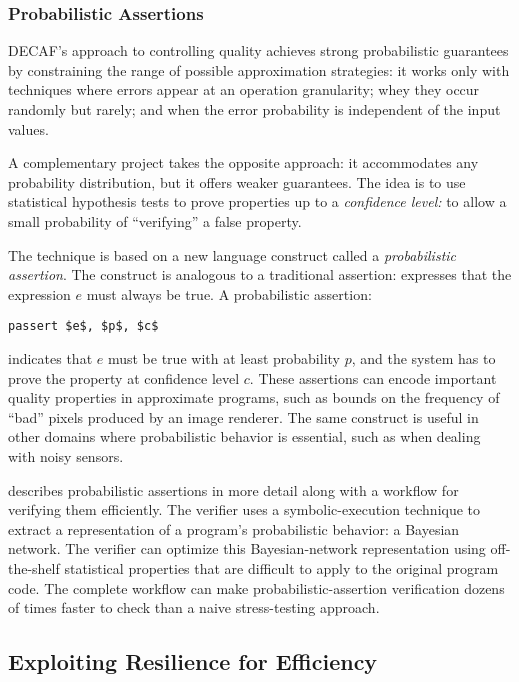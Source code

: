 \subsubsection{Probabilistic Assertions}

DECAF's approach to controlling quality achieves strong probabilistic
guarantees by constraining the range of possible approximation strategies:
it works only with techniques where errors appear at an operation granularity;
whey they occur randomly but rarely; and when the error probability is
independent of the input values.

A complementary project takes the opposite approach:
it accommodates any probability distribution, but it offers weaker
guarantees.
The idea is to use statistical hypothesis tests to prove properties up to a
\emph{confidence level:}
to allow a small probability of ``verifying'' a false property.

The technique is based on a new language construct called a
\emph{probabilistic assertion}.
The construct is analogous to a traditional assertion: 
expresses that the expression $e$ must always be true.
A probabilistic assertion:
%
\begin{lstlisting}
passert $e$, $p$, $c$
\end{lstlisting}
%
indicates that $e$ must
be true with at least probability $p$, and the system has to prove the
property at confidence level $c$.
These assertions can encode important quality properties in approximate
programs, such as bounds on the frequency of ``bad'' pixels produced by an
image renderer.
The same construct is useful in other domains where probabilistic behavior is
essential, such as when dealing with noisy sensors.

 describes probabilistic assertions in more detail
along with a workflow for verifying them efficiently.
The verifier uses a symbolic-execution technique to extract a representation
of a program's probabilistic behavior: a Bayesian network.
The verifier can optimize this Bayesian-network representation using
off-the-shelf statistical properties that are difficult to apply to the
original program code.
The complete workflow can make probabilistic-assertion verification dozens of
times faster to check than a naive stress-testing approach.

\subsection{Exploiting Resilience for Efficiency}

